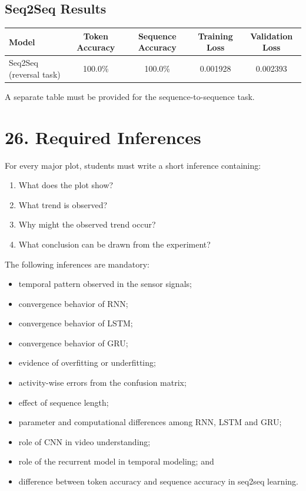 \documentclass[10pt]{article}
\begin{document}
\subsection*{Seq2Seq Results}

\begin{center}

\begin{tabular}{|l|c|c|c|c|}
\hline
\textbf{Model} & \textbf{Token Accuracy} & \textbf{Sequence Accuracy} &
\textbf{Training Loss} & \textbf{Validation Loss} \\
\hline
Seq2Seq (reversal task) & 100.0\% & 100.0\% & 0.001928 & 0.002393 \\
\hline
\end{tabular}

\end{center}

A separate table must be provided for the sequence-to-sequence task.

\section*{26. Required Inferences}

For every major plot, students must write a short inference containing:

\begin{enumerate}
\item What does the plot show?
\item What trend is observed?
\item Why might the observed trend occur?
\item What conclusion can be drawn from the experiment?
\end{enumerate}

The following inferences are mandatory:

\begin{itemize}
\item temporal pattern observed in the sensor signals;
\item convergence behavior of RNN;
\item convergence behavior of LSTM;
\item convergence behavior of GRU;
\item evidence of overfitting or underfitting;
\item activity-wise errors from the confusion matrix;
\item effect of sequence length;
\item parameter and computational differences among RNN, LSTM and GRU;
\item role of CNN in video understanding;
\item role of the recurrent model in temporal modeling; and
\item difference between token accuracy and sequence accuracy in seq2seq learning.
\end{itemize}
\end{document}
